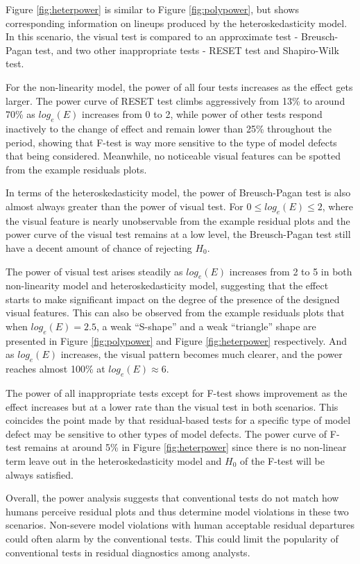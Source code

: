\documentclass[]{interact}
\theoremstyle{plain}%
\theoremstyle{definition}
\theoremstyle{remark}
\begin{document}
Figure \ref{fig:heterpower} is similar to Figure \ref{fig:polypower},
but shows corresponding information on lineups produced by the
heteroskedasticity model. In this scenario, the visual test is compared
to an approximate test - Breusch-Pagan test, and two other inappropriate
tests - RESET test and Shapiro-Wilk test.

For the non-linearity model, the power of all four tests increases as
the effect gets larger. The power curve of RESET test climbs
aggressively from 13\% to around 70\% as \(log_e(E)\) increases from 0
to 2, while power of other tests respond inactively to the change of
effect and remain lower than 25\% throughout the period, showing that
F-test is way more sensitive to the type of model defects that being
considered. Meanwhile, no noticeable visual features can be spotted from
the example residuals plots.

In terms of the heteroskedasticity model, the power of Breusch-Pagan
test is also almost always greater than the power of visual test. For
\(0 \leq log_e(E) \leq 2\), where the visual feature is nearly
unobservable from the example residual plots and the power curve of the
visual test remains at a low level, the Breusch-Pagan test still have a
decent amount of chance of rejecting \(H_0\).

The power of visual test arises steadily as \(log_e(E)\) increases from
2 to 5 in both non-linearity model and heteroskedasticity model,
suggesting that the effect starts to make significant impact on the
degree of the presence of the designed visual features. This can also be
observed from the example residuals plots that when \(log_e(E) = 2.5\),
a weak ``S-shape'' and a weak ``triangle'' shape are presented in Figure
\ref{fig:polypower} and Figure \ref{fig:heterpower} respectively. And as
\(log_e(E)\) increases, the visual pattern becomes much clearer, and the
power reaches almost 100\% at \(log_e(E) \approx 6\).

The power of all inappropriate tests except for F-test shows improvement
as the effect increases but at a lower rate than the visual test in both
scenarios. This coincides the point made by \citet{cook1982residuals}
that residual-based tests for a specific type of model defect may be
sensitive to other types of model defects. The power curve of F-test
remains at around 5\% in Figure \ref{fig:heterpower} since there is no
non-linear term leave out in the heteroskedasticity model and \(H_0\) of
the F-test will be always satisfied.

Overall, the power analysis suggests that conventional tests do not
match how humans perceive residual plots and thus determine model
violations in these two scenarios. Non-severe model violations with
human acceptable residual departures could often alarm by the
conventional tests. This could limit the popularity of conventional
tests in residual diagnostics among analysts.
\end{document}

